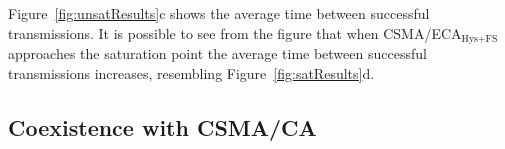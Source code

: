 	
	Figure~\ref{fig:unsatResults}c shows the average time between successful transmissions. It is possible to see from the figure that when CSMA/ECA$_{\text{Hys+FS}}$ approaches the saturation point the average time between successful transmissions increases, resembling Figure~\ref{fig:satResults}d. 
	
	
%	
	
	\subsection{Coexistence with CSMA/CA}\label{coexistance-w-csmaca}
	
